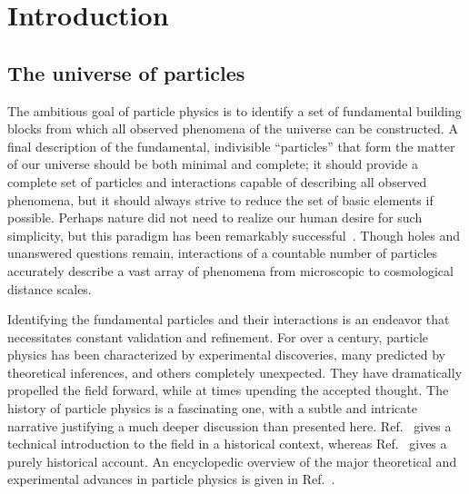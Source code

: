 \chapter{Introduction}
\label{ch:introduction}

\section{The universe of particles}

The ambitious goal of particle physics is to identify a 
set of fundamental building blocks from which all observed
phenomena of the universe can be constructed.
A final description of the fundamental, indivisible ``particles'' that
form the matter of our universe should be both minimal and 
complete; it should provide a complete set of particles and interactions capable of 
describing all observed phenomena, but it should always strive to reduce 
the set of basic elements if possible.
Perhaps nature did not need to realize our human desire for such simplicity,
but this paradigm has been remarkably successful~\cite{Griffiths:2008zz}. 
Though holes and unanswered
questions remain, interactions of a countable number of particles 
accurately describe a vast array of phenomena from 
microscopic to cosmological distance scales.

Identifying the fundamental particles and their interactions is an 
endeavor that necessitates constant validation and refinement.
For over a century, particle physics has been characterized by experimental
discoveries, many predicted by theoretical inferences, and others 
completely unexpected.
They have dramatically propelled the field forward,
while at times upending the accepted thought.
The history of particle physics is a fascinating one, with a subtle 
and intricate narrative justifying a much deeper discussion than presented
here. Ref.~\cite{Griffiths:2008zz} gives a technical introduction to the field in a historical
context, whereas Ref.~\cite{kragh2002quantum} gives a purely 
historical account. An encyclopedic overview of the major
theoretical and experimental advances in particle physics is given in Ref.~\cite{Ezhela:1996xi}.

